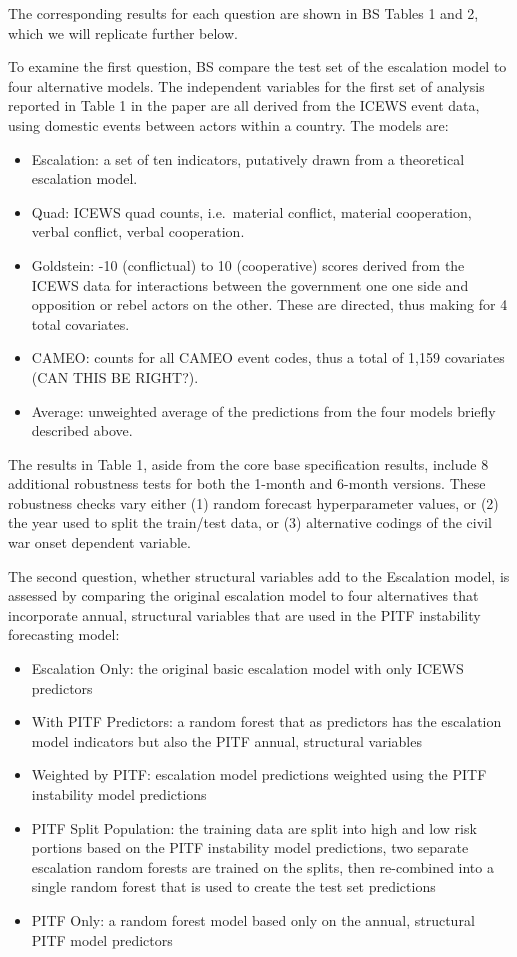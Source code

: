 \documentclass[]{article}
\providecommand{\tightlist}{%
  \setlength{\itemsep}{0pt}\setlength{\parskip}{0pt}}
\begin{document}
The corresponding results for each question are shown in BS Tables 1 and
2, which we will replicate further below.

To examine the first question, BS compare the test set of the escalation
model to four alternative models. The independent variables for the
first set of analysis reported in Table 1 in the paper are all derived
from the ICEWS event data, using domestic events between actors within a
country. The models are:

\begin{itemize}
\tightlist
\item
  Escalation: a set of ten indicators, putatively drawn from a
  theoretical escalation model.
\item
  Quad: ICEWS quad counts, i.e.~material conflict, material cooperation,
  verbal conflict, verbal cooperation.
\item
  Goldstein: -10 (conflictual) to 10 (cooperative) scores derived from
  the ICEWS data for interactions between the government one one side
  and opposition or rebel actors on the other. These are directed, thus
  making for 4 total covariates.
\item
  CAMEO: counts for all CAMEO event codes, thus a total of 1,159
  covariates (CAN THIS BE RIGHT?).
\item
  Average: unweighted average of the predictions from the four models
  briefly described above.
\end{itemize}

The results in Table 1, aside from the core base specification results,
include 8 additional robustness tests for both the 1-month and 6-month
versions. These robustness checks vary either (1) random forecast
hyperparameter values, or (2) the year used to split the train/test
data, or (3) alternative codings of the civil war onset dependent
variable.

The second question, whether structural variables add to the Escalation
model, is assessed by comparing the original escalation model to four
alternatives that incorporate annual, structural variables that are used
in the PITF instability forecasting model:

\begin{itemize}
\tightlist
\item
  Escalation Only: the original basic escalation model with only ICEWS
  predictors
\item
  With PITF Predictors: a random forest that as predictors has the
  escalation model indicators but also the PITF annual, structural
  variables
\item
  Weighted by PITF: escalation model predictions weighted using the PITF
  instability model predictions
\item
  PITF Split Population: the training data are split into high and low
  risk portions based on the PITF instability model predictions, two
  separate escalation random forests are trained on the splits, then
  re-combined into a single random forest that is used to create the
  test set predictions
\item
  PITF Only: a random forest model based only on the annual, structural
  PITF model predictors
\end{itemize}
\end{document}
